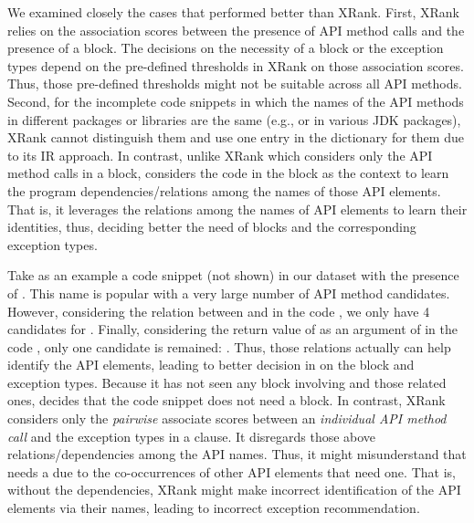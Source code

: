 We examined closely the cases that {\tool} performed better than
XRank.  First, XRank relies on the association scores between the
presence of API method calls and the presence of a 
block. The decisions on the necessity of a  block or
the exception types depend on the pre-defined thresholds in XRank on
those association scores. Thus, those pre-defined thresholds might not
be suitable across all API methods. Second, for the incomplete
code snippets in which the names of the API methods in different
packages or libraries are the same (e.g.,  or
 in various JDK packages), XRank cannot distinguish them
and use one entry in the dictionary for them due to its IR
approach. In contrast, unlike XRank which considers only the API
method calls in a  block, {\tool} considers the code in
the block as the context to learn the program dependencies/relations among the
names of those API elements. That is, it leverages the relations among
the names of API elements to learn their identities, thus,
deciding better the need of  blocks and the
corresponding exception types.


Take as an example a code snippet (not shown) in our dataset with the
presence of . This name is popular with a very large number
of API method candidates.
However, considering the relation between  and
 in the code , we only have
4 candidates for . Finally, considering the return
value of  as an argument of  in
the code , only one candidate is
remained:
.
Thus, those relations actually can help identify the API elements,
leading to better decision in {\tool} on the  block
and exception types.
%
Because it has not seen any  block involving
 and those related ones, {\tool} decides
that the code snippet does not need a  block. In
contrast, XRank considers only the {\em pairwise} associate scores
between an {\em individual API method call} and the exception types
in a  clause. It disregards those above
relations/dependencies among the API names. Thus, it might
misunderstand that  needs a  due to the
co-occurrences of other API elements that need one. That is, without
the dependencies, XRank might make incorrect identification of the API
elements via their names, leading to incorrect exception
recommendation.

